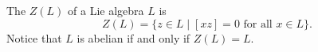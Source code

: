The  $Z(L)$ of a Lie algebra $L$ is
$$Z(L) = \{z \in L \mid [xz] = 0 \text{ for all } x \in L\}.$$
Notice that $L$ is abelian if and only if $Z(L) = L$.
